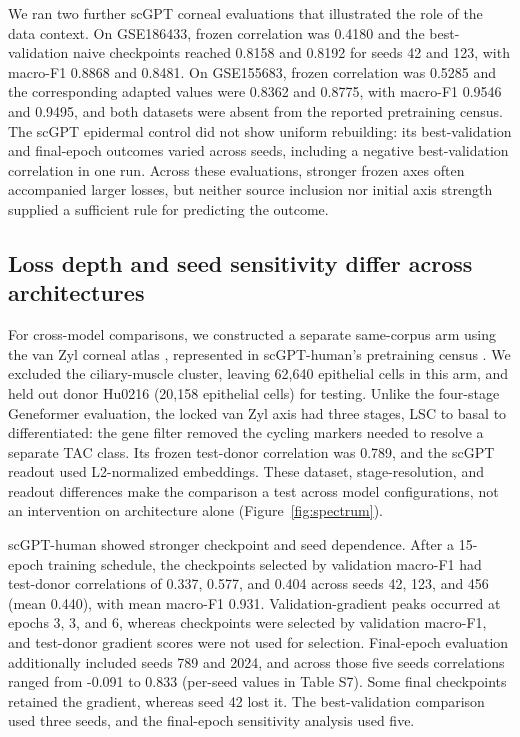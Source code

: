 \documentclass[12pt,letterpaper]{article}
\begin{document}
We ran two further scGPT corneal evaluations that illustrated the role of the data context. On GSE186433, frozen correlation was 0.4180 and the best-validation naive checkpoints reached 0.8158 and 0.8192 for seeds 42 and 123, with macro-F1 0.8868 and 0.8481. On GSE155683, frozen correlation was 0.5285 and the corresponding adapted values were 0.8362 and 0.8775, with macro-F1 0.9546 and 0.9495, and both datasets were absent from the reported pretraining census. The scGPT epidermal control did not show uniform rebuilding: its best-validation and final-epoch outcomes varied across seeds, including a negative best-validation correlation in one run. Across these evaluations, stronger frozen axes often accompanied larger losses, but neither source inclusion nor initial axis strength supplied a sufficient rule for predicting the outcome.

\subsection*{Loss depth and seed sensitivity differ across architectures}

For cross-model comparisons, we constructed a separate same-corpus arm using the van Zyl corneal atlas \cite{vanzyl2022}, represented in scGPT-human's pretraining census \cite{cui2024scgpt}. We excluded the ciliary-muscle cluster, leaving 62,640 epithelial cells in this arm, and held out donor Hu0216 (20,158 epithelial cells) for testing. Unlike the four-stage Geneformer evaluation, the locked van Zyl axis had three stages, LSC to basal to differentiated: the gene filter removed the cycling markers needed to resolve a separate TAC class. Its frozen test-donor correlation was 0.789, and the scGPT readout used L2-normalized embeddings. These dataset, stage-resolution, and readout differences make the comparison a test across model configurations, not an intervention on architecture alone (Figure~\ref{fig:spectrum}).

scGPT-human showed stronger checkpoint and seed dependence. After a 15-epoch training schedule, the checkpoints selected by validation macro-F1 had test-donor correlations of 0.337, 0.577, and 0.404 across seeds 42, 123, and 456 (mean 0.440), with mean macro-F1 0.931. Validation-gradient peaks occurred at epochs 3, 3, and 6, whereas checkpoints were selected by validation macro-F1, and test-donor gradient scores were not used for selection. Final-epoch evaluation additionally included seeds 789 and 2024, and across those five seeds correlations ranged from -0.091 to 0.833 (per-seed values in Table S7). Some final checkpoints retained the gradient, whereas seed 42 lost it. The best-validation comparison used three seeds, and the final-epoch sensitivity analysis used five.
\end{document}
